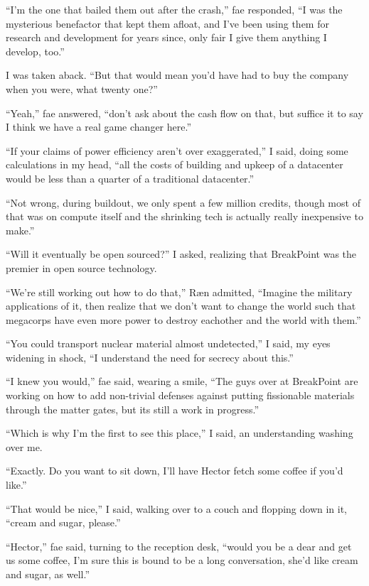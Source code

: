 ``I'm the one that bailed them out after the crash,'' fae responded, ``I was the mysterious benefactor that kept them afloat, and I've been using them for research and development for years since, only fair I give them anything I develop, too.''

I was taken aback.  ``But that would mean you'd have had to buy the company when you were, what twenty one?''

``Yeah,'' fae answered, ``don't ask about the cash flow on that, but suffice it to say I think we have a real game changer here.''

``If your claims of power efficiency aren't over exaggerated,'' I said, doing some calculations in my head, ``all the costs of building and upkeep of a datacenter would be less than a quarter of a traditional datacenter.''

``Not wrong, during buildout, we only spent a few million credits, though most of that was on compute itself and the shrinking tech is actually really inexpensive to make.''

``Will it eventually be open sourced?'' I asked, realizing that BreakPoint was the premier in open source technology.

``We're still working out how to do that,'' Ræn admitted, ``Imagine the military applications of it, then realize that we don't want to change the world such that megacorps have even more power to destroy eachother and the world with them.''

``You could transport nuclear material almost undetected,'' I said, my eyes widening in shock, ``I understand the need for secrecy about this.''

``I knew you would,'' fae said, wearing a smile, ``The guys over at BreakPoint are working on how to add non-trivial defenses against putting fissionable materials through the matter gates, but its still a work in progress.''

``Which is why I'm the first to see this place,'' I said, an understanding washing over me.

``Exactly.  Do you want to sit down, I'll have Hector fetch some coffee if you'd like.''

``That would be nice,'' I said, walking over to a couch and flopping down in it, ``cream and sugar, please.''

``Hector,'' fae said, turning to the reception desk, ``would you be a dear and get us some coffee, I'm sure this is bound to be a long conversation, she'd like cream and sugar, as well.''

